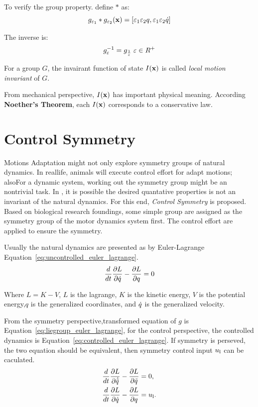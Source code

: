 To verify the group property. define $*$ as:
\[
g_{\varepsilon_1}*g_{\varepsilon_2}(\mathbf{x})=[\varepsilon_1 \varepsilon_2 q, \varepsilon_1 \varepsilon_2 \dot{q}]
\]

The inverse is:
\[
g_{\varepsilon}^{-1}=g_{\frac{1}{\varepsilon}} \;\varepsilon \in R^+
\]

\begin{mydef}
For a group $G$, the invairant function of state $I(\mathbf{x})$ is called \emph{local motion invariant} of $G$. 
\end{mydef}

From mechanical perspective,  $I(\mathbf{x})$ has important physical meaning. 
According  \textbf{Noether's Theorem}, each $I(\mathbf{x})$ corresponds to a conservative law. 


\section{Control Symmetry}
Motions Adaptation might not only explore symmetry groups of natural dynamics.
In reallife, animals will execute control effort for adapt motions; alsoFor a dynamic system, working out the symmetry group might be an nontrivial task.
In \cms, it is possible the desired quantative properties is not an invariant of the natural dynamics.
For this end, \emph{Control Symmetry} is proposed.
Based on biological research foundings\citep{flash2007affine}, some simple group are assigned as the symmetry group of the motor dynamics system first.
The control effort are applied to ensure the symmetry.


Usually the natural dynamics are presented as by Euler-Lagrange Equation~\ref{eq:uncontrolled_euler_lagrange}\citep{Goldstein2002a}.
\begin{equation}
\frac{d}{dt} \frac{\partial L}{\partial \dot{q}} - \frac{\partial L}{\partial q} = 0
\label{eq:uncontrolled_euler_lagrange}
\end{equation}

Where $L=K-V$, $L$ is the lagrange, $K$ is the kinetic energy, $V$ is the potential energy,$q$ is the generalized coordinates, and $\dot{q}$ is the generalized velocity.

From the symmetry perspective,transformed equation of $g$ is Equation~\ref{eq:liegroup_euler_lagrange}, for the control perspective, the controlled dynamics is Equation~\ref{eq:controlled_euler_lagrange}. If symmetry is perseved, the two equation should be equivalent, then symmetry control input $u_{\mathrm{l}}$ can be caculated.
\begin{align}
\frac{d}{dt} \frac{\partial L}{\partial \dot{\tilde{q}}} - \frac{\partial L}{\partial \tilde{q} }&=0,\label{eq:liegroup_euler_lagrange}\\
\frac{d}{dt} \frac{\partial L}{\partial \dot{q}} - \frac{\partial L}{\partial q}&=u_{\mathrm{l}}. \label{eq:controlled_euler_lagrange}
\end{align}





